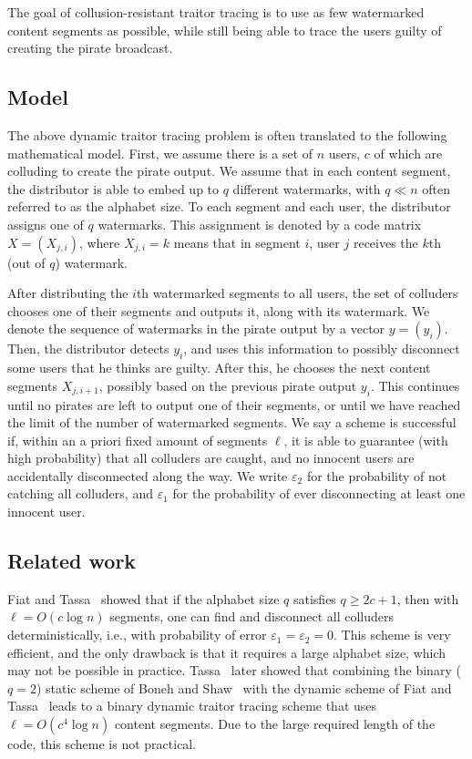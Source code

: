 \documentclass[10pt,a4paper,twocolumn]{article}
\newcommand{\eps}{\varepsilon}
\begin{document}
The goal of collusion-resistant traitor tracing is to use as few watermarked content segments as possible, while still being able to trace the users guilty of creating the pirate broadcast.

\subsection{Model}

The above dynamic traitor tracing problem is often translated to the following mathematical model. First, we assume there is a set of $n$ users, $c$ of which are colluding to create the pirate output. We assume that in each content segment, the distributor is able to embed up to $q$ different watermarks, with $q \ll n$ often referred to as the alphabet size. To each segment and each user, the distributor assigns one of $q$ watermarks. This assignment is denoted by a code matrix $X = (X_{j,i})$, where $X_{j,i} = k$ means that in segment $i$, user $j$ receives the $k$th (out of $q$) watermark. 

After distributing the $i$th watermarked segments to all users, the set of colluders chooses one of their segments and outputs it, along with its watermark. We denote the sequence of watermarks in the pirate output by a vector $y = (y_i)$. Then, the distributor detects $y_i$, and uses this information to possibly disconnect some users that he thinks are guilty. After this, he chooses the next content segments $X_{j,i+1}$, possibly based on the previous pirate output $y_i$. This continues until no pirates are left to output one of their segments, or until we have reached the limit of the number of watermarked segments. We say a scheme is successful if, within an a priori fixed amount of segments $\ell$, it is able to guarantee (with high probability) that all colluders are caught, and no innocent users are accidentally disconnected along the way. We write $\eps_2$ for the probability of not catching all colluders, and $\eps_1$ for the probability of ever disconnecting at least one innocent user.

\subsection{Related work}

Fiat and Tassa~\cite{fiat01} showed that if the alphabet size $q$ satisfies $q \geq 2c + 1$, then with $\ell = O(c \log n)$ segments, one can find and disconnect all colluders deterministically, i.e., with probability of error $\eps_1 = \eps_2 = 0$. This scheme is very efficient, and the only drawback is that it requires a large alphabet size, which may not be possible in practice. Tassa~\cite{tassa05} later showed that combining the binary ($q = 2$) static scheme of Boneh and Shaw~\cite{boneh98} with the dynamic scheme of Fiat and Tassa~\cite{fiat01} leads to a binary dynamic traitor tracing scheme that uses $\ell = O(c^4 \log n)$ content segments. Due to the large required length of the code, this scheme is not practical.
\end{document}
